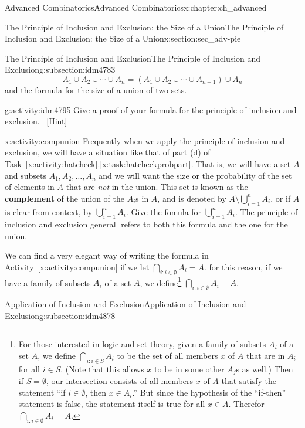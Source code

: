 \documentclass[oneside,10pt,]{book}
\newcommand{\terminology}[1]{\textbf{#1}}
\numberwithin{equation}{chapter}
\begin{document}
\begin{chapterptx}{Advanced Combinatorics}{}{Advanced Combinatorics}{}{}{x:chapter:ch_advanced}
\begin{sectionptx}{The Principle of Inclusion and Exclusion: the Size of a Union}{}{The Principle of Inclusion and Exclusion: the Size of a Union}{}{}{x:section:sec_adv-pie}
\begin{subsectionptx}{The Principle of Inclusion and Exclusion}{}{The Principle of Inclusion and Exclusion}{}{}{g:subsection:idm4783}
\begin{equation*}
A_1 \cup A_2 \cup \cdots \cup A_n = \left(A_1 \cup A_2 \cup \cdots \cup A_{n-1}\right) \cup A_n
\end{equation*}
and the formula for the size of a union of two sets.%
\begin{activity}{}{g:activity:idm4795}%
Give a proof of your formula for the principle of inclusion and exclusion.%
\qquad~\hfill{\tiny\hyperlink{g:hint:idm4798-back}{[Hint]}}\end{activity}
\begin{activity}{}{x:activity:compunion}%
Frequently when we apply the principle of inclusion and exclusion, we will have a situation like that of part (d) of \hyperref[x:task:hatcheckprobpart]{Task~\ref{x:activity:hatcheck}.\ref{x:task:hatcheckprobpart}}.  That is, we will have a set \(A\) and subsets \(A_1, A_2, \ldots, A_n\) and we will want the size or the probability of the set of elements in \(A\) that are \emph{not} in the union.  This set is known as the \terminology{complement}  of the union of the \(A_i\)s in \(A\), and is denoted by \(A \setminus \bigcup_{i=1}^n A_i\), or if \(A\) is clear from context, by \(\overline{\bigcup_{i=1}^n A_i}\). Give the fomula for \(\overline{\bigcup_{i=1}^n A_i}\).  The principle of inclusion and exclusion generall refers to both this formula and the one for the union.%
\end{activity}
We can find a very elegant way of writing the formula in \hyperref[x:activity:compunion]{Activity~\ref{x:activity:compunion}} if we let \(\bigcap_{i:i\in\emptyset}A_i = A\).  for this reason, if we have a family of subsets \(A_i\) of a set \(A\), we define\footnote{For those interested in logic and set theory, given a family of subsets \(A_i\) of a set \(A\), we define \(\bigcap_{i:i\in S}A_i\) to be the set of all members \(x\) of \(A\) that are in \(A_i\) for all \(i \in S\).  (Note that this allows \(x\) to be in some other \(A_j\)s as well.)  Then if \(S = \emptyset\), our intersection consists of all members \(x\) of \(A\) that satisfy the statement ``if \(i\in \emptyset\), then \(x \in A_i\).'' But since the hypothesis of the ``if-then'' statement is false, the statement itself is true for all \(x \in A\).  Therefor \(\bigcap_{i:i \in \emptyset}A_i = A\).\label{g:fn:idm4858}} \(\bigcap_{i:i\in\emptyset}A_i = A\).%
\end{subsectionptx}
%
%
\typeout{************************************************}
\typeout{************************************************}
%
\begin{subsectionptx}{Application of Inclusion and Exclusion}{}{Application of Inclusion and Exclusion}{}{}{g:subsection:idm4878}

\end{subsectionptx}
\end{sectionptx}
\end{chapterptx}
\end{document}
